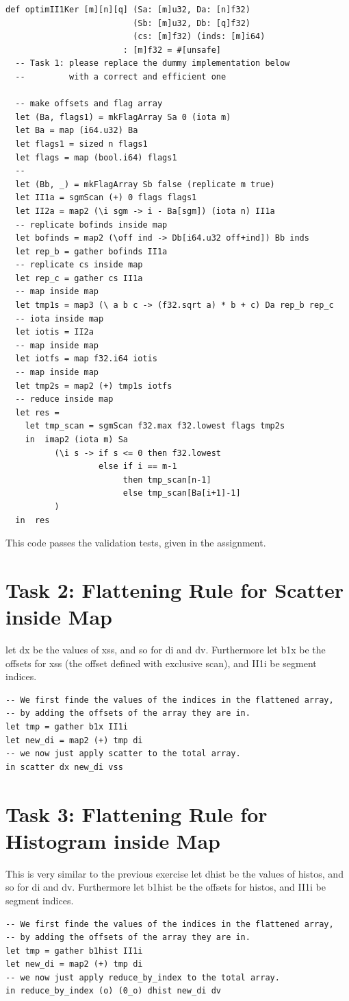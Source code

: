 \documentclass[a4paper,12pt]{article}
\begin{document}
\begin{lstlisting}
def optimII1Ker [m][n][q] (Sa: [m]u32, Da: [n]f32)
                          (Sb: [m]u32, Db: [q]f32)
                          (cs: [m]f32) (inds: [m]i64)
                        : [m]f32 = #[unsafe]
  -- Task 1: please replace the dummy implementation below
  --         with a correct and efficient one

  -- make offsets and flag array
  let (Ba, flags1) = mkFlagArray Sa 0 (iota m)
  let Ba = map (i64.u32) Ba
  let flags1 = sized n flags1
  let flags = map (bool.i64) flags1
  --
  let (Bb, _) = mkFlagArray Sb false (replicate m true)
  let II1a = sgmScan (+) 0 flags flags1
  let II2a = map2 (\i sgm -> i - Ba[sgm]) (iota n) II1a
  -- replicate bofinds inside map
  let bofinds = map2 (\off ind -> Db[i64.u32 off+ind]) Bb inds
  let rep_b = gather bofinds II1a
  -- replicate cs inside map
  let rep_c = gather cs II1a
  -- map inside map
  let tmp1s = map3 (\ a b c -> (f32.sqrt a) * b + c) Da rep_b rep_c
  -- iota inside map
  let iotis = II2a
  -- map inside map
  let iotfs = map f32.i64 iotis
  -- map inside map
  let tmp2s = map2 (+) tmp1s iotfs
  -- reduce inside map
  let res =
    let tmp_scan = sgmScan f32.max f32.lowest flags tmp2s
    in  imap2 (iota m) Sa
          (\i s -> if s <= 0 then f32.lowest
                   else if i == m-1
                        then tmp_scan[n-1]
                        else tmp_scan[Ba[i+1]-1]
          )
  in  res
\end{lstlisting}
This code passes the validation tests, given in the assignment.
\section*{Task 2: Flattening Rule for Scatter inside Map }
let dx be the values of xss, and so for di and dv.
Furthermore let b1x be the offsets for xss (the offset defined with
exclusive scan), and II1i be segment indices.
\begin{lstlisting}
-- We first finde the values of the indices in the flattened array,
-- by adding the offsets of the array they are in.
let tmp = gather b1x II1i
let new_di = map2 (+) tmp di
-- we now just apply scatter to the total array.
in scatter dx new_di vss
\end{lstlisting}
\section*{Task 3: Flattening Rule for Histogram inside Map}
This is very similar to the previous exercise
let dhist be the values of histos, and so for di and dv.
Furthermore let b1hist be the offsets for histos, and II1i be segment indices.
\begin{lstlisting}
-- We first finde the values of the indices in the flattened array,
-- by adding the offsets of the array they are in.
let tmp = gather b1hist II1i
let new_di = map2 (+) tmp di
-- we now just apply reduce_by_index to the total array.
in reduce_by_index (o) (0_o) dhist new_di dv
\end{lstlisting}
\end{document}
